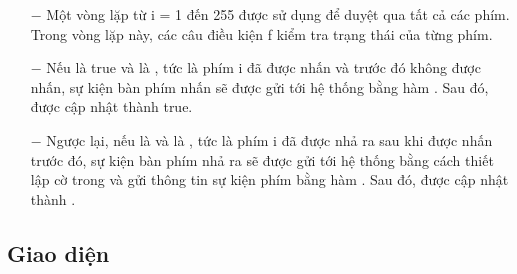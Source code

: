 \begin{itemize}
\begin{itemize}
        \item[$-$] Một vòng lặp từ i = 1 đến 255 được sử dụng để duyệt qua tất cả các phím. Trong vòng lặp này, các câu điều kiện \textbf{}f kiểm tra trạng thái của từng phím.
        \item[$-$] Nếu \textbf{} là true và \textbf{} là \textbf{}, tức là phím i đã được nhấn và trước đó không được nhấn, sự kiện bàn phím nhấn sẽ được gửi tới hệ thống bằng hàm \textbf{}. Sau đó, \textbf{} được cập nhật thành true.
        \item[$-$] Ngược lại, nếu \textbf{} là \textbf{} và \textbf{} là \textbf{}, tức là phím i đã được nhả ra sau khi được nhấn trước đó, sự kiện bàn phím nhả ra sẽ được gửi tới hệ thống bằng cách thiết lập cờ \textbf{} trong \textbf{} và gửi thông tin sự kiện phím bằng hàm \textbf{}. Sau đó, \textbf{} được cập nhật thành \textbf{}.
    \end{itemize}
\end{itemize}
\subsection{Giao diện}
